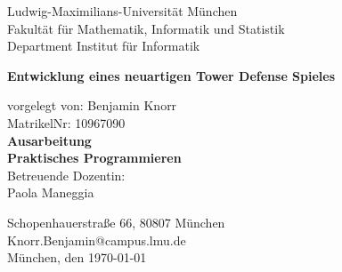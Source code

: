 \begin{titlepage}
{\centering
Ludwig-Maximilians-Universität München\\
Fakultät für Mathematik, Informatik und Statistik\\
Department Institut für Informatik
\vspace{1.5cm}

{\huge\bfseries	Entwicklung eines neuartigen Tower Defense Spieles}
\Large
\vspace{1.5cm}

vorgelegt von: Benjamin Knorr \\
MatrikelNr: 10967090\\[1cm]
\textbf{Ausarbeitung\\
 Praktisches Programmieren}\\[1cm]
Betreuende Dozentin: \\
Paola Maneggia

\vfill
}
Schopenhauerstraße 66, 80807 München \\
Knorr.Benjamin@campus.lmu.de\\
München, den \today
\end{titlepage}
